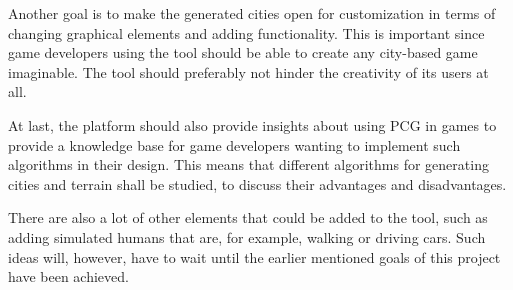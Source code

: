 Another goal is to make the generated cities open for customization in terms of changing graphical elements and adding functionality. This is important since game developers using the tool should be able to create any city-based game imaginable. The tool should preferably not hinder the creativity of its users at all.

At last, the platform should also provide insights about using PCG in games to provide a knowledge base for game developers wanting to implement such algorithms in their design. This means that different algorithms for generating cities and terrain shall be studied, to discuss their advantages and disadvantages.

There are also a lot of other elements that could be added to the tool, such as adding simulated humans that are, for example, walking or driving cars. Such ideas will, however, have to wait until the earlier mentioned goals of this project have been achieved.